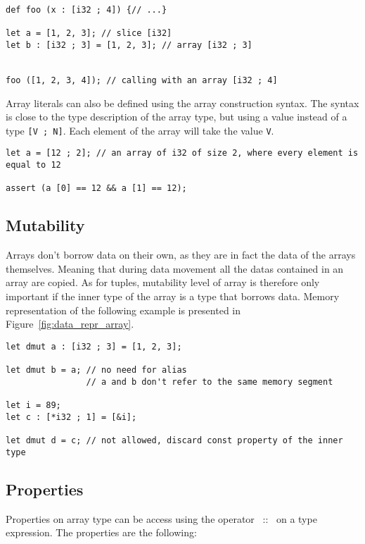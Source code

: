 \begin{lstlisting}[style=coloredverbatim]
def foo (x : [i32 ; 4]) {// ...}

let a = [1, 2, 3]; // slice [i32]
let b : [i32 ; 3] = [1, 2, 3]; // array [i32 ; 3]


foo ([1, 2, 3, 4]); // calling with an array [i32 ; 4]
\end{lstlisting}

Array literals can also be defined using the array construction syntax. The
syntax is close to the type description of the array type, but using a value
instead of a type \texttt{[V ; N]}. Each element of the array will take the
value \texttt{V}.

\begin{lstlisting}[style=coloredverbatim]
let a = [12 ; 2]; // an array of i32 of size 2, where every element is equal to 12

assert (a [0] == 12 && a [1] == 12);
\end{lstlisting}

\subsection {Mutability}

Arrays don't borrow data on their own, as they are in fact the data of the
arrays themselves. Meaning that during data movement all the datas contained in
an array are copied. As for tuples, mutability level of array is therefore only
important if the inner type of the array is a type that borrows data. Memory
representation of the following example is presented in
Figure~\ref{fig:data_repr_array}.

\begin{lstlisting}[style=coloredverbatim]
let dmut a : [i32 ; 3] = [1, 2, 3];

let dmut b = a; // no need for alias
                // a and b don't refer to the same memory segment

let i = 89;
let c : [*i32 ; 1] = [&i];

let dmut d = c; // not allowed, discard const property of the inner type
\end{lstlisting}



\subsection {Properties}

Properties on array type can be access using the operator ~::~ on a type
expression. The properties are the following:


